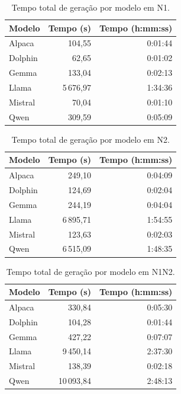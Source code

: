 \documentclass[a4paper,fleqn]{cas-sc}
\newcommand{\melhor}[1]{\textcolor{green!55!black}{#1}}
\newcommand{\pior}[1]{\textcolor{red!80!black}{#1}}
\begin{document}
\begin{table}[ht]
\centering
\caption{Tempo total de geração por modelo em N1.}
\label{tab:tempo_n1}
\begin{tabular}{lrr}
\hline
Modelo & Tempo (s) & Tempo (h:mm:ss) \\
\hline
Alpaca  & 104{,}55 & 0:01:44 \\
Dolphin & \melhor{62{,}65} & \melhor{0:01:02} \\
Gemma   & 133{,}04 & 0:02:13 \\
Llama   & \pior{5\,676{,}97} & \pior{1:34:36} \\
Mistral & 70{,}04 & 0:01:10 \\
Qwen    & 309{,}59 & 0:05:09 \\
\hline
\end{tabular}
\end{table}

\begin{table}[ht]
\centering
\caption{Tempo total de geração por modelo em N2.}
\label{tab:tempo_n2}
\begin{tabular}{lrr}
\hline
Modelo & Tempo (s) & Tempo (h:mm:ss) \\
\hline
Alpaca  & 249{,}10 & 0:04:09 \\
Dolphin & 124{,}69 & 0:02:04 \\
Gemma   & 244{,}19 & 0:04:04 \\
Llama   & \pior{6\,895{,}71} & \pior{1:54:55} \\
Mistral & \melhor{123{,}63} & \melhor{0:02:03} \\
Qwen    & 6\,515{,}09 & 1:48:35 \\
\hline
\end{tabular}
\end{table}

\begin{table}[ht]
\centering
\caption{Tempo total de geração por modelo em N1N2.}
\label{tab:tempo_n1n2}
\begin{tabular}{lrr}
\hline
Modelo & Tempo (s) & Tempo (h:mm:ss) \\
\hline
Alpaca  & 330{,}84 & 0:05:30 \\
Dolphin & \melhor{104{,}28} & \melhor{0:01:44} \\
Gemma   & 427{,}22 & 0:07:07 \\
Llama   & 9\,450{,}14 & 2:37:30 \\
Mistral & 138{,}39 & 0:02:18 \\
Qwen    & \pior{10\,093{,}84} & \pior{2:48:13} \\
\hline
\end{tabular}
\end{table}
\end{document}
